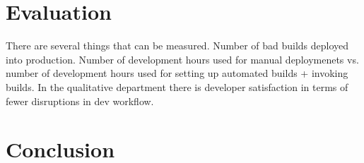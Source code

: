 \documentclass{ituthesis}
\begin{document}
\chapter{Evaluation}

There are several things that can be measured. Number of bad builds deployed into production. Number of development hours used for manual deploymenets vs. number of development hours used for setting up automated builds + invoking builds. In the qualitative department there is developer satisfaction in terms of fewer disruptions in dev workflow. 

\chapter{Conclusion}

\clearpage

\nocite{Humble2010}
\nocite{Bellomo2014}
\nocite{beck2001agile}

\end{document}
